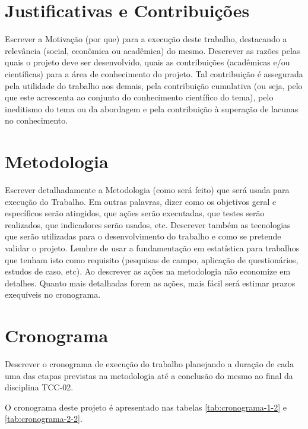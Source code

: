\documentclass[font=plain]{abnt}
\begin{document}
\chapter{Justificativas e Contribuições}

Escrever a Motivação (por que) para a execução deste trabalho, destacando a relevância (social, econômica ou acadêmica) do mesmo. Descrever as razões pelas quais o projeto deve ser desenvolvido, quais as contribuições (acadêmicas e/ou científicas) para a área de conhecimento do projeto. Tal contribuição é assegurada pela utilidade do trabalho aos demais, pela contribuição cumulativa (ou seja, pelo que este acrescenta ao conjunto do conhecimento científico do tema), pelo ineditismo do tema ou da abordagem e pela contribuição à superação de lacunas no conhecimento.

\chapter{Metodologia}
Escrever detalhadamente a Metodologia (como será feito)  que será usada para execução do Trabalho. Em outras palavras, dizer como os objetivos geral e específicos serão atingidos, que ações serão executadas, que testes serão realizados, que indicadores serão usados, etc. Descrever também as tecnologias que serão utilizadas para o desenvolvimento do trabalho e como se pretende validar o projeto. Lembre de usar a fundamentação em estatística para trabalhos que tenham isto como requisito (pesquisas de campo, aplicação de questionários, estudos de caso, etc). Ao descrever as ações na metodologia não economize em detalhes. Quanto mais detalhadas forem as ações, mais fácil será estimar prazos exequíveis no cronograma.


\chapter{Cronograma}

Descrever o cronograma de execução do trabalho planejando a duração de cada uma das etapas previstas na metodologia até a conclusão do mesmo ao final da disciplina TCC-02.

O cronograma deste projeto é apresentado nas tabelas \ref{tab:cronograma-1-2} e \ref{tab:cronograma-2-2}.
\end{document}
